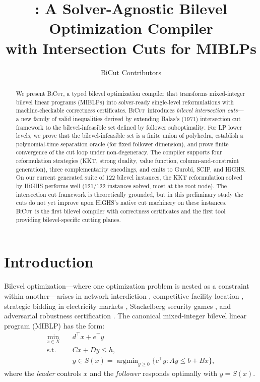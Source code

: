 \documentclass[11pt]{article}
\title{\BiCut: A Solver-Agnostic Bilevel Optimization Compiler\\with Intersection Cuts for MIBLPs}
\author{BiCut Contributors}
\date{}
\newcommand{\argmin}{\mathop{\mathrm{argmin}}}
\newcommand{\BiCut}{\textsc{BiCut}}
\begin{document}
\maketitle

\begin{abstract}
We present \BiCut, a typed bilevel optimization compiler that transforms
mixed-integer bilevel linear programs (MIBLPs) into solver-ready
single-level reformulations with machine-checkable correctness certificates.
\BiCut\ introduces \emph{bilevel intersection cuts}---a new family of valid
inequalities derived by extending Balas's (1971) intersection cut framework
to the bilevel-infeasible set defined by follower suboptimality.
For LP lower levels, we prove that the bilevel-infeasible set is a finite
union of polyhedra, establish a polynomial-time separation oracle (for fixed
follower dimension), and prove finite convergence of the cut loop under
non-degeneracy. The compiler supports four reformulation strategies
(KKT, strong duality, value function, column-and-constraint generation),
three complementarity encodings, and emits to Gurobi, SCIP, and HiGHS.
On our current generated suite of 122 bilevel instances, the KKT
reformulation solved by HiGHS performs well (121/122 instances solved,
most at the root node). The intersection cut framework is
theoretically grounded, but in this preliminary study the cuts do not
yet improve upon HiGHS's native cut machinery on these instances.
\BiCut\ is the first bilevel compiler with correctness certificates and
the first tool providing bilevel-specific cutting planes.
\end{abstract}

\section{Introduction}
\label{sec:intro}

Bilevel optimization---where one optimization problem is nested as a
constraint within another---arises in network interdiction
\cite{israeli2002shortest}, competitive facility location
\cite{kucukaydin2011competitive}, strategic bidding in electricity markets
\cite{ruiz2009pool}, Stackelberg security games
\cite{tambe2011security}, and adversarial robustness certification
\cite{sinha2018review}. The canonical mixed-integer bilevel linear
program (MIBLP) has the form:
\begin{align}
\min_{x \in X} \quad & d^\top x + e^\top y \label{eq:bilevel}\\
\text{s.t.} \quad & Cx + Dy \leq h, \nonumber\\
& y \in S(x) = \argmin_{y \geq 0}\{ c^\top y : Ay \leq b + Bx \}, \nonumber
\end{align}
where the \emph{leader} controls $x$ and the \emph{follower} responds
optimally with $y = S(x)$.
\end{document}
